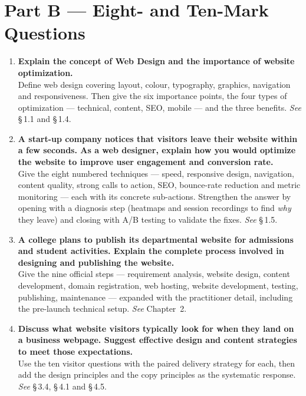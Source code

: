 \section*{Part B --- Eight- and Ten-Mark Questions}

\begin{enumerate}[leftmargin=2.2em,itemsep=1.4ex]

\item \textbf{Explain the concept of Web Design and the importance of website
      optimization.} \\
      Define web design covering layout, colour, typography, graphics, navigation
      and responsiveness. Then give the six importance points, the four types of
      optimization --- technical, content, SEO, mobile --- and the three benefits.
      \hfill\emph{See} \S\,1.1 and \S\,1.4.

\item \textbf{A start-up company notices that visitors leave their website within
      a few seconds. As a web designer, explain how you would optimize the website
      to improve user engagement and conversion rate.}
      \\
      Give the eight numbered techniques --- speed, responsive design, navigation,
      content quality, strong calls to action, SEO, bounce-rate reduction and
      metric monitoring --- each with its concrete sub-actions. Strengthen the
      answer by opening with a diagnosis step (heatmaps and session recordings to
      find \emph{why} they leave) and closing with A/B testing to validate the
      fixes. \hfill\emph{See} \S\,1.5.

\item \textbf{A college plans to publish its departmental website for admissions
      and student activities. Explain the complete process involved in designing
      and publishing the website.} \\
      Give the nine official steps --- requirement analysis, website design,
      content development, domain registration, web hosting, website development,
      testing, publishing, maintenance --- expanded with the practitioner detail,
      including the pre-launch technical setup. \hfill\emph{See} Chapter~2.

\item \textbf{Discuss what website visitors typically look for when they land on a
      business webpage. Suggest effective design and content strategies to meet
      those expectations.} \\
      Use the ten visitor questions with the paired delivery strategy for each,
      then add the design principles and the copy principles as the systematic
      response. \hfill\emph{See} \S\,3.4, \S\,4.1 and \S\,4.5.


\end{enumerate}
